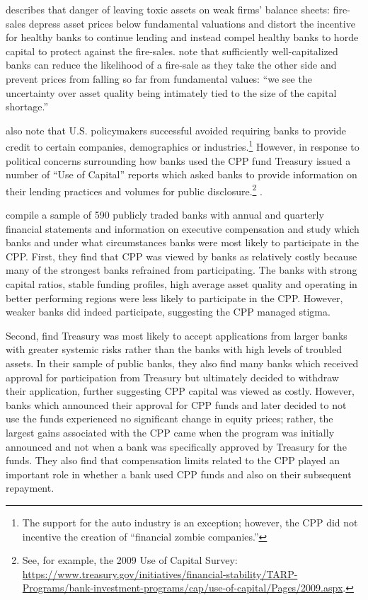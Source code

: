 \documentclass[12pt]{article}
\begin{document}
\citet{Diamond} describes that danger of leaving toxic assets on weak firms' balance sheets: fire-sales depress asset prices below fundamental valuations and distort the incentive for healthy banks to continue lending and instead compel healthy banks to horde capital to protect against the fire-sales. \citet{Hoshi} note that sufficiently well-capitalized banks can reduce the likelihood of a fire-sale as they take the other side and prevent prices from falling so far from fundamental values: ``we see the uncertainty over asset quality being intimately tied to the size of the capital shortage.''

\citet{Hoshi} also note that U.S. policymakers successful avoided requiring banks to provide credit to certain companies, demographics or industries.\footnote{The support for the auto industry is an exception; however, the CPP did not incentive the creation of ``financial zombie companies.''} However, in response to political concerns surrounding how banks used the CPP fund Treasury issued a number of ``Use of Capital'' reports which asked banks to provide information on their lending practices and volumes for public disclosure.\footnote{See, for example, the 2009 Use of Capital Survey: \url{https://www.treasury.gov/initiatives/financial-stability/TARP-Programs/bank-investment-programs/cap/use-of-capital/Pages/2009.aspx}.} \citep{Bernanke}.

\citet{Ba} compile a sample of 590 publicly traded banks with annual and quarterly financial statements and information on executive compensation and study which banks and under what circumstances banks were most likely to participate in the CPP. First, they find that CPP was viewed by banks as relatively costly because many of the strongest banks refrained from participating. The banks with strong capital ratios, stable funding profiles, high average asset quality and operating in better performing regions were less likely to participate in the CPP. However, weaker banks did indeed participate, suggesting the CPP managed stigma.

Second, \citet{Ba} find Treasury was most likely to accept applications from larger banks with greater systemic risks rather than the banks with high levels of troubled assets. In their sample of public banks, they also find many banks which received approval for participation from Treasury but ultimately decided to withdraw their application, further suggesting CPP capital was viewed as costly. However, banks which announced their approval for CPP funds and later decided to not use the funds experienced no significant change in equity prices; rather, the largest gains associated with the CPP came when the program was initially announced and not when a bank was specifically approved by Treasury for the funds. They also find that compensation limits related to the CPP played an important role in whether a bank used CPP funds and also on their subsequent repayment.
\end{document}
